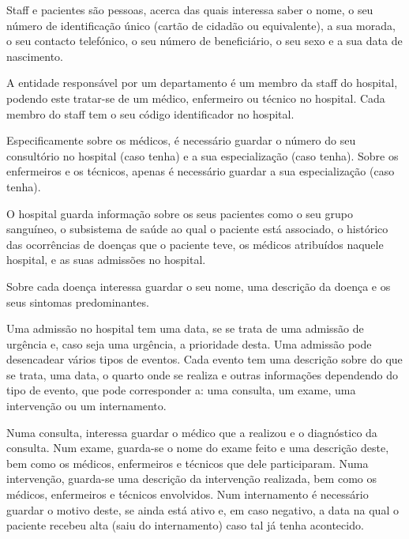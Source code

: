 \documentclass[article, a4paper, 12pt, oneside]{memoir}
\begin{document}
Staff e pacientes são pessoas, acerca das quais interessa saber o nome, o seu número de identificação único (cartão de cidadão ou equivalente), a sua morada, o seu contacto telefónico, o seu número de beneficiário, o seu sexo e a sua data de nascimento.

A entidade responsável por um departamento é um membro da staff do hospital, podendo este tratar-se de um médico, enfermeiro ou técnico no hospital. Cada membro do staff tem o seu código identificador no hospital.

Especificamente sobre os médicos, é necessário guardar o número do seu consultório no hospital (caso tenha) e a sua especialização (caso tenha).
Sobre os enfermeiros e os técnicos, apenas é necessário guardar a sua especialização (caso tenha).

O hospital guarda informação sobre os seus pacientes como o seu grupo sanguíneo, o subsistema de saúde ao qual o paciente está associado, o histórico das ocorrências de doenças que o paciente teve, os médicos atribuídos naquele hospital, e as suas admissões no hospital.

Sobre cada doença interessa guardar o seu nome, uma descrição da doença e os seus sintomas predominantes.

Uma admissão no hospital tem uma data, se se trata de uma admissão de urgência e, caso seja uma urgência, a prioridade desta. Uma admissão pode desencadear vários tipos de eventos. Cada evento tem uma descrição sobre do que se trata, uma data, o quarto onde se realiza e outras informações dependendo do tipo de evento, que pode corresponder a: uma consulta, um exame, uma intervenção ou um internamento.

Numa consulta, interessa guardar o médico que a realizou e o diagnóstico da consulta.
Num exame, guarda-se o nome do exame feito e uma descrição deste, bem como os médicos, enfermeiros e técnicos que dele participaram.
Numa intervenção, guarda-se uma descrição da intervenção realizada, bem como os médicos, enfermeiros e técnicos envolvidos.
Num internamento é necessário guardar o motivo deste, se ainda está ativo e, em caso negativo, a data na qual o paciente recebeu alta (saiu do internamento) caso tal já tenha acontecido.

\newpage
\end{document}
